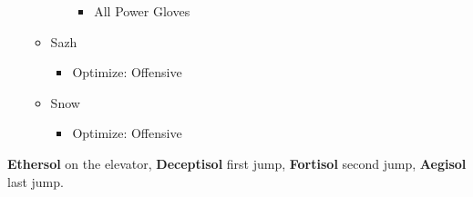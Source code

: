 \begin{menu}
\begin{multicols}{2}
\begin{itemize}
\begin{itemize}
\begin{itemize}
\begin{itemize}
                \item All Power Gloves
            \end{itemize}
        \end{itemize}
        \item Sazh
        \begin{itemize}
            \item Optimize: Offensive
        \end{itemize}
        \item Snow
        \begin{itemize}
            \item Optimize: Offensive
        \end{itemize}
    \end{itemize}
\end{itemize}
\end{multicols}
\end{menu}
\textbf{Ethersol} on the elevator, \textbf{Deceptisol} first jump, \textbf{Fortisol} second jump, \textbf{Aegisol} last jump.
\renewcommand{\first}{[1] Tireless Charge (\com/\com/\med)}
\renewcommand{\second}{[2] Aggression (\com/\com/\rav)}
\renewcommand{\third}{[3] Consolidation (\sen/\sen/\med)}
\renewcommand{\fourth}{[4] Malevolence (\syn/\rav/\rav)}
\renewcommand{\fifth}{[5] Smart Bomb (\rav/\rav/\sab)}
\renewcommand{\sixth}{[6] Tri-Disaster (\rav/\rav/\rav)}
